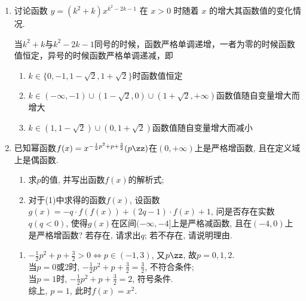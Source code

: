 \begin{enumerate}
\item 讨论函数 $y=\left(k^2+k\right) x^{k^2-2 k-1}$ 在 $x>0$ 时随着 $x$ 的增大其函数值的变化情况.

\begin{jieda}
    当$k^2+k$与$k^2-2 k-1$同号的时候，函数严格单调递增，一者为零的时候函数值恒定，异号的时候函数严格单调递减，即
    \begin{enumerate}
        \item $k \in \{0, -1, 1-\sqrt{2}, 1+\sqrt{2}\}$时函数值恒定
        \item $k \in (-\infty, -1) \cup (1-\sqrt{2}, 0) \cup (1+\sqrt{2}, +\infty)$函数值随自变量增大而增大
        \item $k \in (1, 1-\sqrt{2}) \cup (0, 1+\sqrt{2})$函数值随自变量增大而减小
    \end{enumerate}
\end{jieda}

\begin{vspace_}
\vsp[3]
\end{vspace_}


\item 已知幂函数$f(x)=x^{-\frac{1}{2}p^2+p+\frac{3}{2}}(p\zz)$在$(0,+\infty)$上是严格增函数, 且在定义域上是偶函数. 
\begin{enumerate}
\item 求$p$的值, 并写出函数$f(x)$的解析式; 
\item 对于(1)中求得的函数$f(x)$, 设函数$g(x)=-q\cdot f(f(x))+(2q-1)\cdot f(x)+1$, 问是否存在实数$q(q<0)$, 
使得$g(x)$在区间$(-\infty,-4]$上是严格减函数, 且在$(-4,0)$上是严格增函数? 若存在, 请求出$q$; 若不存在, 请说明理由.
\end{enumerate}
\begin{jieda}
\begin{enumerate}[(1)]
\item $-\frac{1}{2}p^2+p+\frac{3}{2}>0\iff p\in(-1,3)$, 又$p\zz$, 故$p=0,1,2$. \\
当$p=0$或2时, $-\frac{1}{2}p^2+p+\frac{3}{2}=\frac{3}{2}$, 不符合条件; \\
当$p=1$时, $-\frac{1}{2}p^2+p+\frac{3}{2}=2$, 符号条件. \\
综上, $p=1$, 此时$f(x)=x^2$. 


\end{enumerate}
\end{jieda}
\end{enumerate}
